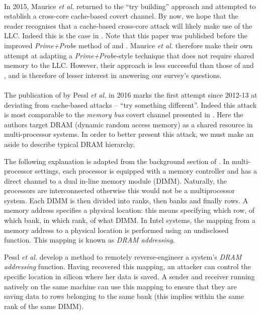 \documentclass[orivec,envcountsame, a4paper, 11pt]{llncs}
\begin{document}
\paragraph{} In 2015, Maurice \textit{et al.} \cite{Maurice2015} returned to the ``try building'' approach and attempted to establish a cross-core cache-based covert channel. By now, we hope that the reader recognises that a cache-based cross-core attack will likely make use of the LLC. Indeed this is the case in \cite{Maurice2015}. Note that this paper was published before the improved \textit{Prime+Probe} method of \cite{Irazoqui2015} and \cite{Liu2015}. Maurice \textit{et al.} \cite{Maurice2015} therefore make their own attempt at adapting a \textit{Prime+Probe}-style technique that does not require shared memory to the LLC. However, their approach is less successful than those of \cite{Irazoqui2015} and \cite{Liu2015}, and is therefore of lesser interest in answering our survey's questions.

\paragraph{} The publication of \cite{Pessl2016} by Pessl \textit{et al.} in 2016 marks the first attempt since 2012-13 at deviating from cache-based attacks -- ``try something different''. Indeed this attack is most comparable to the \textit{memory bus} covert channel presented in \cite{Wu2012}. Here the authors target DRAM (dynamic random access memory) as a shared resource in multi-processor systems. In order to better present this attack, we must make an aside to describe typical DRAM hierarchy.

The following explanation is adapted from the background section of \cite{Pessl2016}. In multi-processor settings, each processor is equipped with a memory controller and has a direct channel to a dual in-line memory module (DIMM). Naturally, the processors are interconnected otherwise this would not be a multiprocessor system. Each DIMM is then divided into ranks, then banks and finally rows. A memory address specifies a physical location: this means specifying which row, of which bank, in which rank, of what DIMM. In Intel systems, the mapping from a memory address to a physical location is performed using an undisclosed function. This mapping is known as \textit{DRAM addressing}.

Pessl \textit{et al.} \cite{Pessl2016} develop a method to remotely reverse-engineer a system's \textit{DRAM addressing} function. Having recovered this mapping, an attacker can control the specific location in silicon where her data is saved. A sender and receiver running natively on the same machine can use this mapping to ensure that they are saving data to rows belonging to the same bank (this implies within the same rank of the same DIMM).
\end{document}
